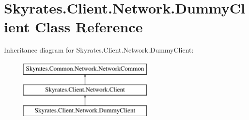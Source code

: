 \hypertarget{class_skyrates_1_1_client_1_1_network_1_1_dummy_client}{\section{Skyrates.\-Client.\-Network.\-Dummy\-Client Class Reference}
\label{class_skyrates_1_1_client_1_1_network_1_1_dummy_client}
}
Inheritance diagram for Skyrates.\-Client.\-Network.\-Dummy\-Client\-:\begin{figure}[H]
\begin{center}
\leavevmode
\includegraphics[height=3.000000cm]{class_skyrates_1_1_client_1_1_network_1_1_dummy_client}
\end{center}
\end{figure}
